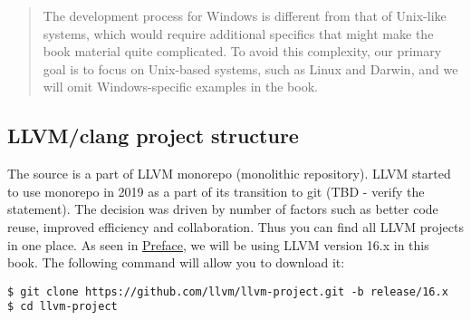 \begin{quote}
The development process for Windows is different from that of Unix-like systems,
which would require additional specifics that might make the book material quite
complicated. To avoid this complexity, our primary goal is to focus on
Unix-based systems, such as Linux and Darwin, and we will omit Windows-specific
examples in the book.
\end{quote}

\subsection{LLVM/clang project structure}
The \clang source is a part of LLVM monorepo (monolithic repository). LLVM
started to use monorepo in 2019 as a part of its transition to git
\citep{llvm:llvm2git} (TBD - verify the statement). The decision was driven by
number of factors such as 
better code reuse, improved efficiency and collaboration. Thus you can find all
LLVM projects in one place. As seen in \hyperref[sec:preface]{Preface}, we will
be using LLVM version 16.x in this book. The following command will allow you to
download it:  
\begin{adjustwidth}{0em}{0em}
\begin{verbatim}
$ git clone https://github.com/llvm/llvm-project.git -b release/16.x
$ cd llvm-project
\end{verbatim}
\end{adjustwidth}

